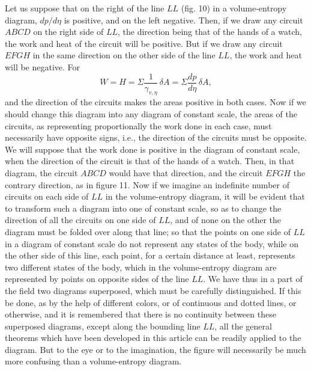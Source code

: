 \documentclass[11pt]{article}
\begin{document}
Let us suppose that on the right of the line $LL$ (fig. 10) in a volume-entropy diagram, $dp/d\eta$ is positive, and on the left negative. Then, if we draw any circuit $ABCD$ on the right side of $LL$, the direction being that of the hands of a watch, the work and heat of the circuit will be positive. But if we draw any circuit $EFGH$ in the same direction on the other side of the line $LL$, the work and heat will be negative. For
\[
W=H=\Sigma\frac{1}{\gamma_{v,\eta}}\,\delta A
=\Sigma\frac{dp}{d\eta}\,\delta A,
\]
and the direction of the circuits makes the areas positive in both cases. Now if we should change this diagram into any diagram of constant scale, the areas of the circuits, as representing proportionally the work done in each case, must necessarily have opposite signs, i.e., the direction of the circuits must be opposite. We will suppose that the work done is positive in the diagram of constant scale, when the direction of the circuit is that of the hands of a watch. Then, in that diagram, the circuit $ABCD$ would have that direction, and the circuit $EFGH$ the contrary direction, as in figure 11. Now if we imagine an indefinite number of circuits on each side of $LL$ in the volume-entropy diagram, it will be evident that to transform such a diagram into one of constant scale, so as to change the direction of all the circuits on one side of $LL$, and of none on the other the diagram must be folded over along that line; so that the points on one side of $LL$ in a diagram of constant scale do not represent any states of the body, while on the other side of this line, each point, for a certain distance at least, represents two different states of the body, which in the volume-entropy diagram are represented by points on opposite sides of the line $LL$. We have thus in a part of the field two diagrams superposed, which must be carefully distinguished. If this be done, as by the help of different colors, or of continuous and dotted lines, or otherwise, and it is remembered that there is no continuity between these superposed diagrams, except along the bounding line $LL$, all the general theorems which have been developed in this article can be readily applied to the diagram. But to the eye or to the imagination, the figure will necessarily be much more confusing than a volume-entropy diagram.
\end{document}

